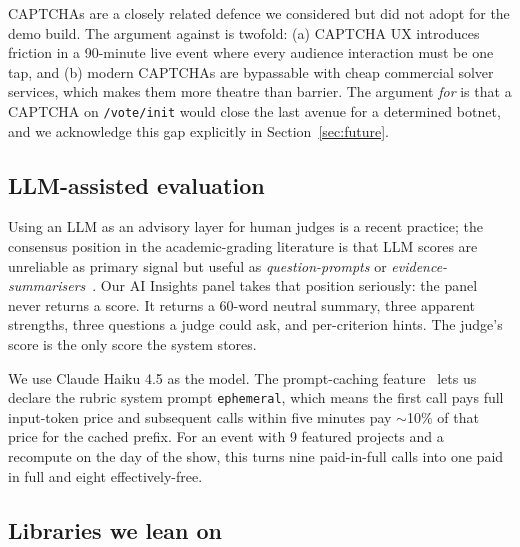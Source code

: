 CAPTCHAs are a closely related defence we considered but did not adopt
for the demo build. The argument against is twofold: (a) CAPTCHA UX
introduces friction in a 90-minute live event where every audience
interaction must be one tap, and (b) modern CAPTCHAs are bypassable
with cheap commercial solver services, which makes them more theatre
than barrier. The argument \emph{for} is that a CAPTCHA on
\texttt{/vote/init} would close the last avenue for a determined botnet,
and we acknowledge this gap explicitly in
Section~\ref{sec:future}.

\subsection{LLM-assisted evaluation}

Using an LLM as an advisory layer for human judges is a recent
practice; the consensus position in the academic-grading literature is that
LLM scores are unreliable as primary signal but useful as
\emph{question-prompts} or \emph{evidence-summarisers}~\cite{burstein-llm}.
Our AI Insights panel takes that position seriously: the panel never
returns a score. It returns a 60-word neutral summary, three apparent
strengths, three questions a judge could ask, and per-criterion hints.
The judge's score is the only score the system stores.

We use Claude Haiku 4.5 as the model. The prompt-caching
feature~\cite{anthropic-cache} lets us declare the rubric system prompt
\texttt{ephemeral}, which means the first call pays full input-token price
and subsequent calls within five minutes pay $\sim$10\% of that price for
the cached prefix. For an event with 9 featured projects and a recompute
on the day of the show, this turns nine paid-in-full calls into one paid
in full and eight effectively-free.

\subsection{Libraries we lean on}

